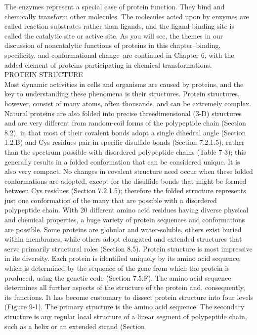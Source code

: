 The enzymes represent a special case of protein function. They bind and chemically transform other molecules. The molecules acted upon by enzymes are called reaction substrates rather than ligands, and the ligand-binding site is called the catalytic site or active site. As you will see, the themes in our discussion of noncatalytic functions of proteins in this chapter--binding, specificity, and conformational change--are continued in Chapter 6, with the added element of proteins participating in chemical transformations.
\cite{nelson2008lehninger}
\\
PROTEIN STRUCTURE\\
Most dynamic activities in cells and organisms are caused by proteins, and the key to understanding
these phenomena is their structures. Protein structures, however, consist of many atoms, often
thousands, and can be extremely complex. Natural proteins are also folded into precise threedimensional
(3-D) structures and are very different from random-coil forms of the polypeptide chain
(Section 8.2), in that most of their covalent bonds adopt a single dihedral angle (Section 1.2.B) and
Cys residues pair in specific disulfide bonds (Section 7.2.1.5), rather than the spectrum possible with
disordered polypeptide chains (Table 7-3); this generally results in a folded conformation that can be
considered unique. It is also very compact. No changes in covalent structure need occur when these
folded conformations are adopted, except for the disulfide bonds that might be formed between Cys
residues (Section 7.2.1.5); therefore the folded structure represents just one conformation of the many
that are possible with a disordered polypeptide chain. With 20 different amino acid residues having
diverse physical and chemical properties, a huge variety of protein sequences and conformations are
possible. Some proteins are globular and water-soluble, others exist buried within membranes, while
others adopt elongated and extended structures that serve primarily structural roles (Section 8.5).
Protein structure is most impressive in its diversity.
Each protein is identified uniquely by its amino acid sequence, which is determined by the
sequence of the gene from which the protein is produced, using the genetic code (Section 7.5.F). The
amino acid sequence determines all further aspects of the structure of the protein and, consequently,
its functions. It has become customary to dissect protein structure into four levels (Figure 9-1).
The primary structure is the amino acid sequence. The secondary structure is any regular local
structure of a linear segment of polypeptide chain, such as a helix or an extended strand (Section
